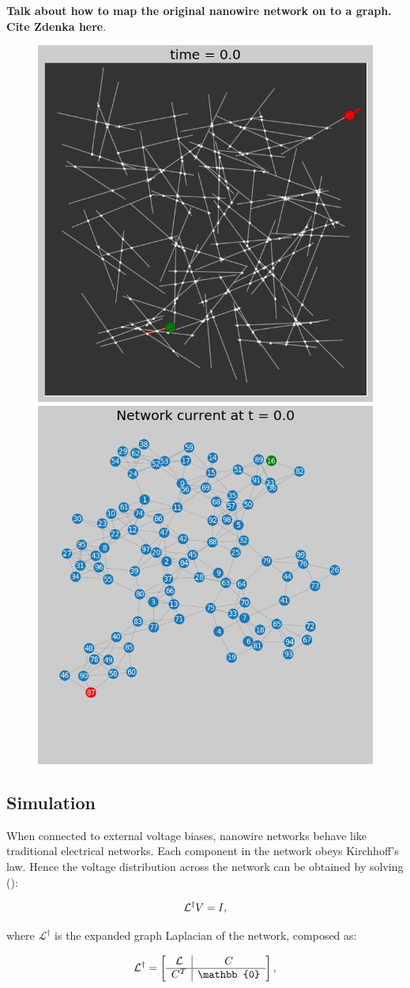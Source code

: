 \documentclass[fleqn,10pt,  reprint, amsmath,amssymb,aps, floatfix]{wlscirep}
\begin{document}
\textbf{Talk about how to map the original nanowire network on to a graph. Cite Zdenka here}.

\begin{figure}[h]
	\centering
	\includegraphics[width=0.45\linewidth]{figure/mpl_plot}
	\includegraphics[width=0.45\linewidth]{figure/graph_plot}
	\caption{}
	\label{fig:nws}
\end{figure}

\subsection*{\label{sec:level2} Simulation}
When connected to external voltage biases, nanowire networks behave like traditional electrical networks. Each component in the network obeys Kirchhoff's law. Hence the voltage distribution across the network can be obtained by solving (\cite{Dorfler2018}):

\begin{equation}
{\cal L}^\dagger V = I,
\end{equation}

where $\mathcal{L}^\dagger$ is the expanded graph Laplacian of the network, composed as:

\begin{equation}
	\cal L^\dagger = 
	\left[
	\begin{array}{c|c}
	\cal L&  C\\ 
	\hline
	C^T & \mathbb{0}  
	\end{array}
	\right],
\end{equation}
\end{document}
